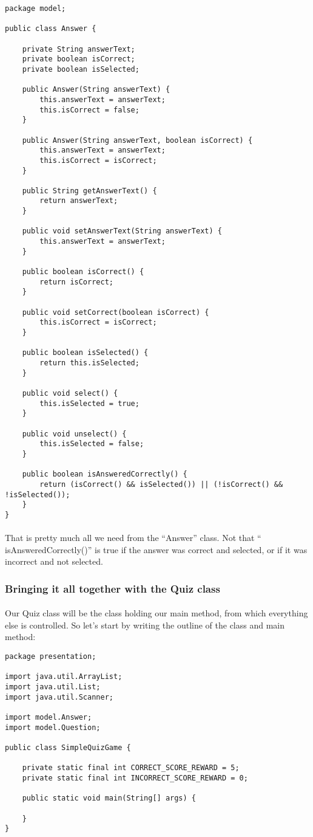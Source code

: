 \documentclass[11pt,fleqn]{book} %
\begin{document}
\begin{lstlisting}
package model;

public class Answer {
	
	private String answerText;
	private boolean isCorrect;
	private boolean isSelected;
	
	public Answer(String answerText) {
		this.answerText = answerText;
		this.isCorrect = false;
	}
	
	public Answer(String answerText, boolean isCorrect) {
		this.answerText = answerText;
		this.isCorrect = isCorrect;
	}

	public String getAnswerText() {
		return answerText;
	}

	public void setAnswerText(String answerText) {
		this.answerText = answerText;
	}

	public boolean isCorrect() {
		return isCorrect;
	}

	public void setCorrect(boolean isCorrect) {
		this.isCorrect = isCorrect;
	}
	
	public boolean isSelected() {
		return this.isSelected;
	}
	
	public void select() {
		this.isSelected = true;
	}
	
	public void unselect() {
		this.isSelected = false;
	}

	public boolean isAnsweredCorrectly() {
		return (isCorrect() && isSelected()) || (!isCorrect() && !isSelected());
	}
}
\end{lstlisting}
\paragraph{} That is pretty much all we need from the ``Answer'' class. Not that `` isAnsweredCorrectly()'' is true if the answer was correct and selected, or if it was incorrect and not selected.

\subsubsection{Bringing it all together with the Quiz class}
\paragraph{} Our Quiz class will be the class holding our main method, from which everything else is controlled. So let's start by writing the outline of the class and main method:

\begin{lstlisting}
package presentation;

import java.util.ArrayList;
import java.util.List;
import java.util.Scanner;

import model.Answer;
import model.Question;

public class SimpleQuizGame {

	private static final int CORRECT_SCORE_REWARD = 5;
	private static final int INCORRECT_SCORE_REWARD = 0;
	
	public static void main(String[] args) {
		
	}
}
\end{lstlisting}
\end{document}
